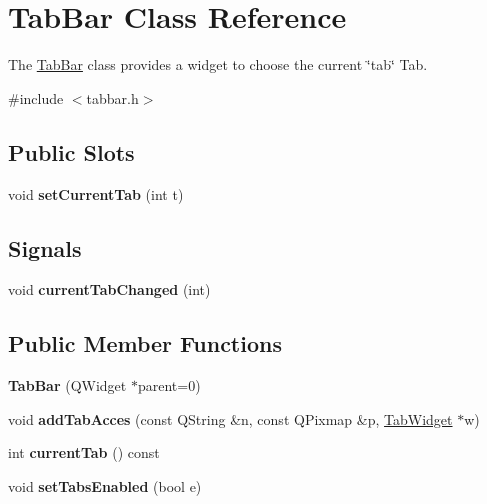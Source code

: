 \hypertarget{class_tab_bar}{\section{\-Tab\-Bar \-Class \-Reference}
\label{class_tab_bar}
}


\-The \hyperlink{class_tab_bar}{\-Tab\-Bar} class provides a widget to choose the current \char`\"{}tab\char`\"{} \-Tab.  




{\ttfamily \#include $<$tabbar.\-h$>$}

\subsection*{\-Public \-Slots}
\begin{DoxyCompactItemize}
\item 
\hypertarget{class_tab_bar_a71b20e36e9d73a3ab7de30af404b4f67}{void {\bfseries set\-Current\-Tab} (int t)}\label{class_tab_bar_a71b20e36e9d73a3ab7de30af404b4f67}

\end{DoxyCompactItemize}
\subsection*{\-Signals}
\begin{DoxyCompactItemize}
\item 
\hypertarget{class_tab_bar_af1823815958705f27ab8e7a90262c27e}{void {\bfseries current\-Tab\-Changed} (int)}\label{class_tab_bar_af1823815958705f27ab8e7a90262c27e}

\end{DoxyCompactItemize}
\subsection*{\-Public \-Member \-Functions}
\begin{DoxyCompactItemize}
\item 
\hypertarget{class_tab_bar_ad91da41e8bfec9cf184f36b49ba4bf6b}{{\bfseries \-Tab\-Bar} (\-Q\-Widget $\ast$parent=0)}\label{class_tab_bar_ad91da41e8bfec9cf184f36b49ba4bf6b}

\item 
\hypertarget{class_tab_bar_a4eb314982505463c3244a007b4e5a813}{void {\bfseries add\-Tab\-Acces} (const \-Q\-String \&n, const \-Q\-Pixmap \&p, \hyperlink{class_tab_widget}{\-Tab\-Widget} $\ast$w)}\label{class_tab_bar_a4eb314982505463c3244a007b4e5a813}

\item 
\hypertarget{class_tab_bar_a78cf61eaaaf5ceed7de52bc3ff1ca07c}{int {\bfseries current\-Tab} () const }\label{class_tab_bar_a78cf61eaaaf5ceed7de52bc3ff1ca07c}

\item 
\hypertarget{class_tab_bar_a6bb891b77ab937e8d97022cf7d46cf3a}{void {\bfseries set\-Tabs\-Enabled} (bool e)}\label{class_tab_bar_a6bb891b77ab937e8d97022cf7d46cf3a}

\end{DoxyCompactItemize}


